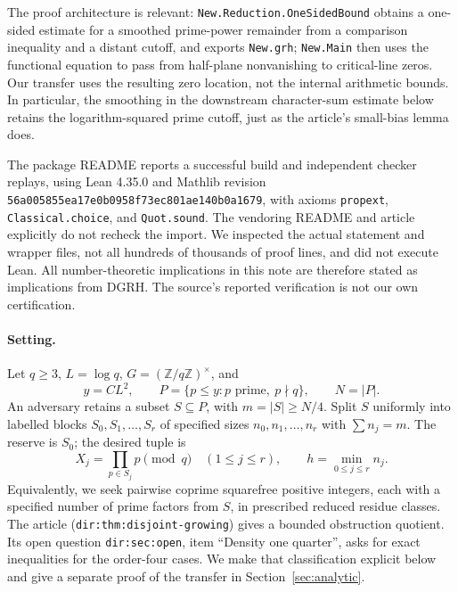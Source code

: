 \documentclass[11pt]{article}
\theoremstyle{remark}\newtheorem{remark}[theorem]{Remark}
\newcommand{\Z}{\mathbb Z}\newcommand{\C}{\mathbb C}\newcommand{\Pp}{\mathbb P}\newcommand{\E}{\mathbb E}\newcommand{\floor}[1]{\left\lfloor #1\right\rfloor}\newcommand{\supp}{\operatorname{supp}}\newcommand{\ord}{\operatorname{ord}}\newcommand{\G}{\Gamma}\newcommand{\DGRH}{\textnormal{\scshape DGRH}}
\begin{document}
The proof architecture is relevant: \texttt{New.Reduction.OneSidedBound} obtains a one-sided estimate for a smoothed prime-power remainder from a comparison inequality and a distant cutoff, and exports \texttt{New.grh}; \texttt{New.Main} then uses the functional equation to pass from half-plane nonvanishing to critical-line zeros. Our transfer uses the resulting zero location, not the internal arithmetic bounds. In particular, the smoothing in the downstream character-sum estimate below retains the logarithm-squared prime cutoff, just as the article's small-bias lemma does.

The package README reports a successful build and independent checker replays, using Lean 4.35.0 and Mathlib revision \texttt{56a005855ea17e0b0958f73ec801ae140b0a1679}, with axioms \texttt{propext}, \texttt{Classical.choice}, and \texttt{Quot.sound}. The vendoring README and article explicitly do not recheck the import. We inspected the actual statement and wrapper files, not all hundreds of thousands of proof lines, and did not execute Lean. All number-theoretic implications in this note are therefore stated as implications from \DGRH. The source's reported verification is not our own certification.

\paragraph{Setting.} Let $q\ge3$, $L=\log q$, $G=(\Z/q\Z)^\times$, and
\[
 y=C L^2,\qquad P=\{p\le y:p\text{ prime},\ p\nmid q\},\qquad N=|P|.
\]
An adversary retains a subset $S\subseteq P$, with $m=|S|\ge N/4$. Split $S$ uniformly into labelled blocks $S_0,S_1,\ldots,S_r$ of specified sizes $n_0,n_1,\ldots,n_r$ with $\sum n_j=m$. The reserve is $S_0$; the desired tuple is
\[
 X_j=\prod_{p\in S_j}p\pmod q\quad (1\le j\le r),\qquad h=\min_{0\le j\le r} n_j.
\]
Equivalently, we seek pairwise coprime squarefree positive integers, each with a specified number of prime factors from $S$, in prescribed reduced residue classes. The article \cite{article} (\texttt{dir:thm:disjoint-growing}) gives a bounded obstruction quotient. Its open question \texttt{dir:sec:open}, item ``Density one quarter'', asks for exact inequalities for the order-four cases. We make that classification explicit below and give a separate proof of the transfer in Section~\ref{sec:analytic}.
\end{document}
